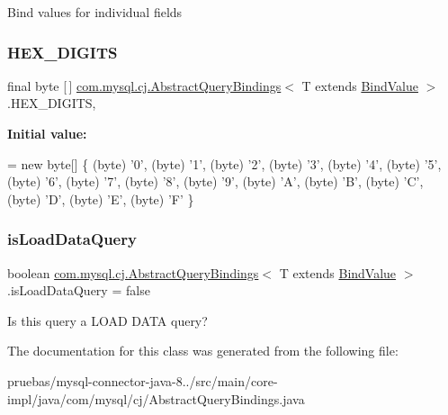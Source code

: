 Bind values for individual fields \mbox{\label{classcom_1_1mysql_1_1cj_1_1_abstract_query_bindings_a99bfec5248e2cfa0e17827ebe33422db}} 
\subsubsection{\texorpdfstring{H\+E\+X\+\_\+\+D\+I\+G\+I\+TS}{HEX\_DIGITS}}
{\footnotesize\ttfamily final byte \mbox{[}$\,$\mbox{]} \mbox{\hyperlink{classcom_1_1mysql_1_1cj_1_1_abstract_query_bindings}{com.\+mysql.\+cj.\+Abstract\+Query\+Bindings}}$<$ T extends \mbox{\hyperlink{interfacecom_1_1mysql_1_1cj_1_1_bind_value}{Bind\+Value}} $>$.H\+E\+X\+\_\+\+D\+I\+G\+I\+TS\hspace{0.3cm}{\ttfamily [static]}, {\ttfamily [protected]}}

{\bfseries Initial value\+:}
\begin{DoxyCode}
= \textcolor{keyword}{new} byte[] \{ (byte) \textcolor{charliteral}{'0'}, (byte) \textcolor{charliteral}{'1'}, (byte) \textcolor{charliteral}{'2'}, (byte) \textcolor{charliteral}{'3'}, (byte) \textcolor{charliteral}{'4'}, (byte) \textcolor{charliteral}{'5'}, (byte) \textcolor{charliteral}{'6'}, (byte) \textcolor{charliteral}{
      '7'},
            (byte) \textcolor{charliteral}{'8'}, (byte) \textcolor{charliteral}{'9'}, (byte) \textcolor{charliteral}{'A'}, (byte) \textcolor{charliteral}{'B'}, (byte) \textcolor{charliteral}{'C'}, (byte) \textcolor{charliteral}{'D'}, (byte) \textcolor{charliteral}{'E'}, (byte) \textcolor{charliteral}{'F'} 
      \}
\end{DoxyCode}
\mbox{\label{classcom_1_1mysql_1_1cj_1_1_abstract_query_bindings_ae057e7a1b56daa198a730198f3040523}} 
\subsubsection{\texorpdfstring{is\+Load\+Data\+Query}{isLoadDataQuery}}
{\footnotesize\ttfamily boolean \mbox{\hyperlink{classcom_1_1mysql_1_1cj_1_1_abstract_query_bindings}{com.\+mysql.\+cj.\+Abstract\+Query\+Bindings}}$<$ T extends \mbox{\hyperlink{interfacecom_1_1mysql_1_1cj_1_1_bind_value}{Bind\+Value}} $>$.is\+Load\+Data\+Query = false\hspace{0.3cm}{\ttfamily [protected]}}

Is this query a L\+O\+AD D\+A\+TA query? 

The documentation for this class was generated from the following file\+:\begin{DoxyCompactItemize}
\item 
pruebas/mysql-\/connector-\/java-\/8../src/main/core-\/impl/java/com/mysql/cj/Abstract\+Query\+Bindings.\+java\end{DoxyCompactItemize}

